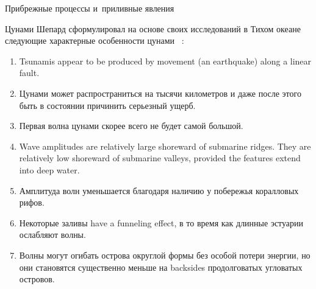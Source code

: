 \begin{chapter}{Прибрежные процессы и~приливные явления}
\begin{section}{Цунами}
Шепард сформулировал на основе своих исследований
в Тихом океане следующие характерные особенности цунами%
~\cite[гл.~4]{Shepard:1963}:
%
%
\begin{enumerate}
\item
Tsunamis appear to be produced by movement (an earthquake) along a
linear fault.
%

\item 
Цунами может распространиться на тысячи километров и даже после этого
быть в состоянии причинить серьезный ущерб.
%

\item
Первая волна цунами скорее всего не будет самой большой.
%

\item
Wave amplitudes are relatively large shoreward of submarine
ridges. They are relatively low shoreward of submarine valleys,
provided the features extend into deep water.
%

\item
Амплитуда волн уменьшается благодаря наличию у побережья коралловых
рифов.
%

\item
Некоторые заливы have a funneling effect, 
в то время как длинные эстуарии ослабляют волны.
%

\item
Волны могут огибать острова округлой формы без особой потери энергии,
но они становятся существенно меньше на backsides продолговатых угловатых
островов.
%
\end{enumerate}


\end{section}
\end{chapter}

